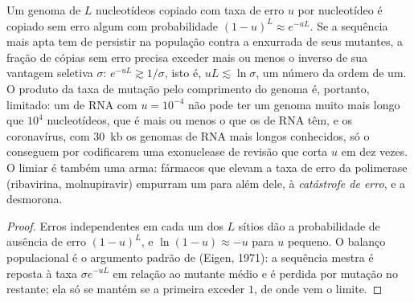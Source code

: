 \begin{proposition}\label{prop:b3:virology:error-threshold}
Um genoma de $L$ nucleotídeos copiado com taxa de erro $u$ por
nucleotídeo é copiado sem erro algum com probabilidade
$(1-u)^{L} \approx e^{-uL}$. Se a sequência mais apta tem de persistir
na população contra a enxurrada de seus mutantes, a fração de cópias
sem erro precisa exceder mais ou menos o inverso de sua vantagem
seletiva $\sigma$: $e^{-uL} \gtrsim
1/\sigma$, isto é,
$uL \lesssim \ln\sigma$, um número da ordem de um. O produto da taxa de
mutação pelo comprimento do genoma é, portanto, limitado: um  de
RNA com $u = 10^{-4}$ não pode ter um genoma muito mais longo que
$10^{4}$ nucleotídeos, que é mais ou menos o que os  de RNA têm, e
os coronavírus, com \qty{30}{kb} os genomas de RNA mais longos
conhecidos, só o conseguem por codificarem uma exonuclease de revisão
que corta $u$ em dez vezes. O limiar é também uma arma: fármacos que
elevam a taxa de erro da polimerase (ribavirina, molnupiravir) empurram
um  para além dele, à \emph{catástrofe de erro}, e a
 desmorona.
\end{proposition}
\begin{proof}
Erros independentes em cada um dos $L$ sítios dão a probabilidade de
ausência de erro $(1-u)^{L}$, e $\ln(1-u) \approx -u$ para $u$ pequeno.
O balanço populacional é o argumento padrão de  (Eigen,
1971): a sequência mestra é reposta à taxa $\sigma e^{-uL}$ em relação
ao mutante médio e é perdida por mutação no restante; ela só se mantém
se a primeira exceder $1$, de onde vem o limite.
\end{proof}

